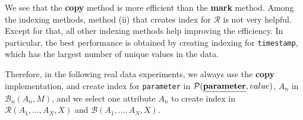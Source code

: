 We see that the {\bf copy} method is more efficient than the {\bf mark} method. Among the indexing methods, method (ii) that creates index for $\mathcal{R}$ is not very helpful. Except for that, all other indexing methods help improving the efficiency.  In particular, the best performance is obtained by creating indexing for {\tt timestamp}, which has the largest number of unique values in the data.

Therefore, in the following real data experiments, we always use the {\bf copy} implementation, and create index for {\tt parameter} in $\mathcal{P}(\textrm{\underline{\bf parameter}}, value)$, $A_n$ in $\mathcal{B}_n(A_n, M)$, and we select one attribute $A_n$ to create index in  $\mathcal{R}(A_1, ..., A_N, X)$ and  $\mathcal{B}(A_1, ..., A_N, X)$.

\bgroup
\def\arraystretch{1} %

